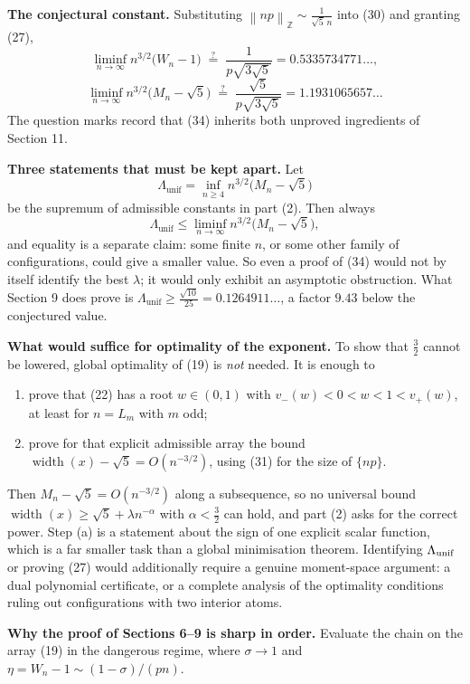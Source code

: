\documentclass[12pt]{article}
\newcommand{\W}{\operatorname{width}}
\newcommand{\ZZ}{\mathbb Z}
\newcommand{\normZ}[1]{\left\lVert #1\right\rVert_{\ZZ}}
\begin{document}
\textbf{The conjectural constant.} Substituting
\(\normZ{np}\sim\frac1{\sqrt5\,n}\) into (30) and granting (27),
\[
\liminf_{n\to\infty}n^{3/2}\bigl(W_n-1\bigr)
\;\overset{?}{=}\;\frac1{p\sqrt{3\sqrt5}}=0.5335734771\ldots,
\tag{34}
\]
\[
\liminf_{n\to\infty}n^{3/2}\bigl(M_n-\sqrt5\bigr)
\;\overset{?}{=}\;\frac{\sqrt5}{p\sqrt{3\sqrt5}}=1.1931065657\ldots
\]
The question marks record that (34) inherits both unproved ingredients
of Section 11.

\textbf{Three statements that must be kept apart.} Let
\[
\Lambda_{\mathrm{unif}}=\inf_{n\ge4}n^{3/2}\bigl(M_n-\sqrt5\bigr)
\]
be the supremum of admissible constants in part (2). Then always
\[
\Lambda_{\mathrm{unif}}\le\liminf_{n\to\infty}n^{3/2}\bigl(M_n-\sqrt5\bigr),
\]
and equality is a separate claim: some finite \(n\), or some other family
of configurations, could give a smaller value. So even a proof of (34)
would not by itself identify the best \(\lambda\); it would only exhibit
an asymptotic obstruction. What Section 9 does prove is
\(\Lambda_{\mathrm{unif}}\ge\frac{\sqrt{10}}{25}=0.1264911\ldots\), a
factor \(9.43\) below the conjectured value.

\textbf{What would suffice for optimality of the exponent.} To show that
\(\frac32\) cannot be lowered, global optimality of (19) is \emph{not}
needed. It is enough to
\begin{enumerate}
\item[(a)] prove that (22) has a root \(w\in(0,1)\) with
\(v_-(w)<0<w<1<v_+(w)\), at least for \(n=L_m\) with \(m\) odd;
\item[(b)] prove for that explicit admissible array the bound
\(\W(x)-\sqrt5=O(n^{-3/2})\), using (31) for the size of \(\{np\}\).
\end{enumerate}
Then \(M_n-\sqrt5=O(n^{-3/2})\) along a subsequence, so no universal
bound \(\W(x)\ge\sqrt5+\lambda n^{-\alpha}\) with \(\alpha<\frac32\) can
hold, and part (2) asks for the correct power. Step (a) is a statement
about the sign of one explicit scalar function, which is a far smaller
task than a global minimisation theorem. Identifying \(\Lambda_{\rm
unif}\) or proving (27) would additionally require a genuine
moment-space argument: a dual polynomial certificate, or a complete
analysis of the optimality conditions ruling out configurations with two
interior atoms.

\textbf{Why the proof of Sections 6--9 is sharp in order.} Evaluate the
chain on the array (19) in the dangerous regime, where \(\sigma\to1\) and
\(\eta=W_n-1\sim(1-\sigma)/(pn)\).
\end{document}
